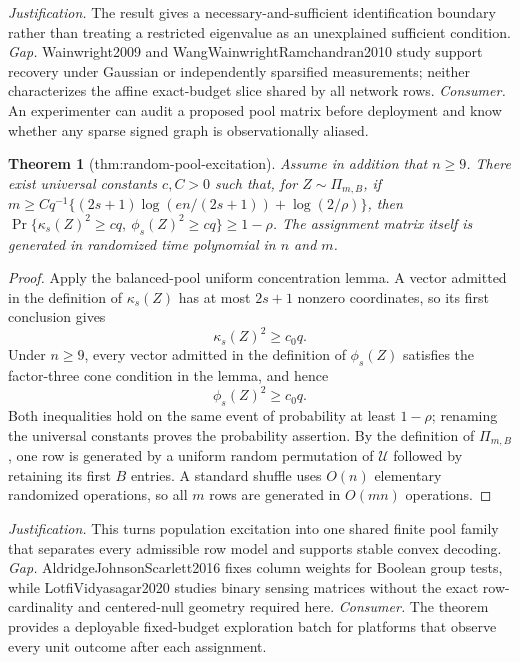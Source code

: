 \documentclass{article}
\newtheorem{theorem}{Theorem}
\begin{document}
\par\smallskip\noindent \textit{Justification.} The result gives a necessary-and-sufficient identification boundary rather than treating a restricted eigenvalue as an unexplained sufficient condition. \textit{Gap.} Wainwright2009 and WangWainwrightRamchandran2010 study support recovery under Gaussian or independently sparsified measurements; neither characterizes the affine exact-budget slice shared by all network rows. \textit{Consumer.} An experimenter can audit a proposed pool matrix before deployment and know whether any sparse signed graph is observationally aliased.

\begin{theorem}[thm:random-pool-excitation]\label{thm:random-pool-excitation}
Assume in addition that \(n\ge9\). There exist universal constants \(c,C>0\) such that, for \(Z\sim\Pi_{m,B}\), if \(m\ge Cq^{-1}\{(2s+1)\log(en/(2s+1))+\log(2/\rho)\}\), then \(\Pr\{\kappa_s(Z)^2\ge cq,\ \phi_s(Z)^2\ge cq\}\ge1-\rho\). The assignment matrix itself is generated in randomized time polynomial in \(n\) and \(m\).
\end{theorem}
\begin{proof}
Apply the balanced-pool uniform concentration lemma.  A vector admitted in the definition of \(\kappa_s(Z)\) has at most \(2s+1\) nonzero coordinates, so its first conclusion gives
\[
 \kappa_s(Z)^2\ge c_0q.
\]
Under \(n\ge9\), every vector admitted in the definition of \(\phi_s(Z)\) satisfies the factor-three cone condition in the lemma, and hence
\[
 \phi_s(Z)^2\ge c_0q.
\]
Both inequalities hold on the same event of probability at least \(1-\rho\); renaming the universal constants proves the probability assertion.  By the definition of \(\Pi_{m,B}\), one row is generated by a uniform random permutation of \(\mathcal U\) followed by retaining its first \(B\) entries.  A standard shuffle uses \(O(n)\) elementary randomized operations, so all \(m\) rows are generated in \(O(mn)\) operations.
\end{proof}
\par\smallskip\noindent \textit{Justification.} This turns population excitation into one shared finite pool family that separates every admissible row model and supports stable convex decoding. \textit{Gap.} AldridgeJohnsonScarlett2016 fixes column weights for Boolean group tests, while LotfiVidyasagar2020 studies binary sensing matrices without the exact row-cardinality and centered-null geometry required here. \textit{Consumer.} The theorem provides a deployable fixed-budget exploration batch for platforms that observe every unit outcome after each assignment.
\end{document}

